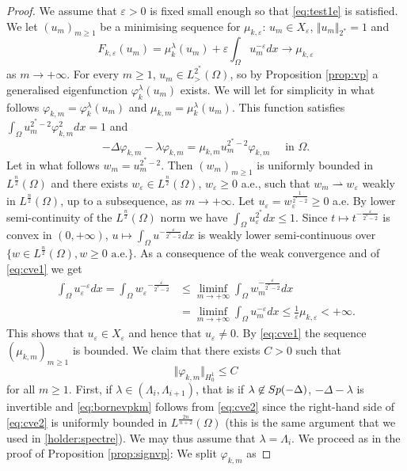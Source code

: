 \documentclass[10pt,a4paper]{amsart}
\newcommand{\Fke}{F_{k,\ve}}
\newcommand{\Om}{\Omega}
\newcommand{\Sp}{{\rm Sp}}
\newcommand{\mkle}{\mu_{k,\ve}}
\newcommand{\mkl}{\mu_{k}^{\lambda}}
\newcommand{\ve}{\varepsilon}
\newcommand{\vkl}{\varphi_{k}^{\lambda}}
\newcommand{\vp}{\varphi}
\begin{document}
\begin{proof}
We assume that $\ve>0$ is fixed small enough so that \eqref{eq:test1e} is satisfied. We let $(u_m)_{m\ge 1}$ be a minimising sequence for $\mkle$: $u_m \in X_\ve$, $\Vert u_m \Vert_{2^*} =1$ and 
\begin{equation} \label{eq:cve1}
\Fke(u_m) = \mkl(u_m)  + \ve \int_{\Om} u_m^{-\ve}dx  \to \mkle
\end{equation}
 as $m \to + \infty$. For every $m \ge 1$, $u_m \in L^{2^*}_>(\Om)$, so by Proposition \ref{prop:vp} a generalised eigenfunction $\vkl(u_m)$ exists. We will let for simplicity in what follows $\vp_{k,m} = \vkl(u_m)$ and $ \mu_{k,m} = \mkl(u_m)$. This function satisfies $\int_{\Om} u_m^{2^*-2} \vp_{k,m}^2dx = 1$  and 
\begin{equation} \label{eq:cve2}
 - \Delta \vp_{k,m} - \lambda \vp_{k,m} = \mu_{k,m} u_m^{2^*-2} \vp_{k,m} \quad \text{ in } \Om. 
 \end{equation}
Let in what follows $w_m = u_m^{2^*-2}$. Then $(w_m)_{m \ge1}$ is uniformly bounded in $L^{\frac{n}{2}}(\Om)$ and there exists $w_\ve \in L^{\frac{n}{2}}(\Om)$, $w_\ve \ge 0$ a.e., such that $w_m \rightharpoonup w_\ve$ weakly in $L^{\frac{n}{2}}(\Om)$, up to a subsequence, as $m \to + \infty$. Let $u_\ve = w_\ve^{\frac{1}{2^*-2}} \ge0$ a.e. By lower semi-continuity of the $L^{\frac{n}{2}}(\Om)$ norm we have $ \int_{\Om} u_\ve^{2^*}dx \le 1$. Since $t \mapsto t^{-\frac{\ve}{2^*-2}}$ is convex in $(0, + \infty)$, $u \mapsto \int_{\Om} u^{-\frac{\ve}{2^*-2}} dx$ is weakly lower semi-continuous over $\{ w \in L^{\frac{n}{2}}(\Om), w \ge 0 \text{ a.e.} \}$. As a consequence of the weak convergence and of \eqref{eq:cve1} we get
\begin{equation} \label{eq:cve3}
\begin{aligned}
 \int_{\Om} u_\ve^{-\ve}dx = \int_{\Om} {w_\ve}^{- \frac{\ve}{2^*-2}} &\le \liminf_{m \to + \infty}  \int_{\Om} w_m^{-\frac{\ve}{2^*-2}}dx \\
 &=  \liminf_{m \to + \infty}  \int_{\Om} u_m^{-\ve}dx  \le \frac{1}{\ve} \mkle < + \infty. 
\end{aligned} 
 \end{equation}
This shows that $u_\ve \in X_\ve$ and hence that $u_\ve \neq 0$. By \eqref{eq:cve1} the sequence $(\mu_{k,m})_{m \ge1}$ is bounded. We claim that there exists $C >0$ such that 
\begin{equation} \label{eq:bornevpkm}
\Vert \vp_{k,m} \Vert_{H^1_0} \le C
\end{equation}
for all $m \ge 1$. First, if $\lambda \in (\Lambda_i, \Lambda_{i+1})$, that is if $\lambda \not \in \Sp(-\Delta)$, $-\Delta- \lambda$ is invertible and \eqref{eq:bornevpkm} follows from \eqref{eq:cve2} since the right-hand side of \eqref{eq:cve2} is uniformly bounded in $L^{\frac{2n}{n+2}}(\Om)$ (this is the same argument that we used in \eqref{holder:spectre}). We may thus assume that $\lambda = \Lambda_i$. We proceed as in the proof of Proposition \ref{prop:signvp}: We split $\vp_{k,m}$ as 

\end{proof}
\end{document}
